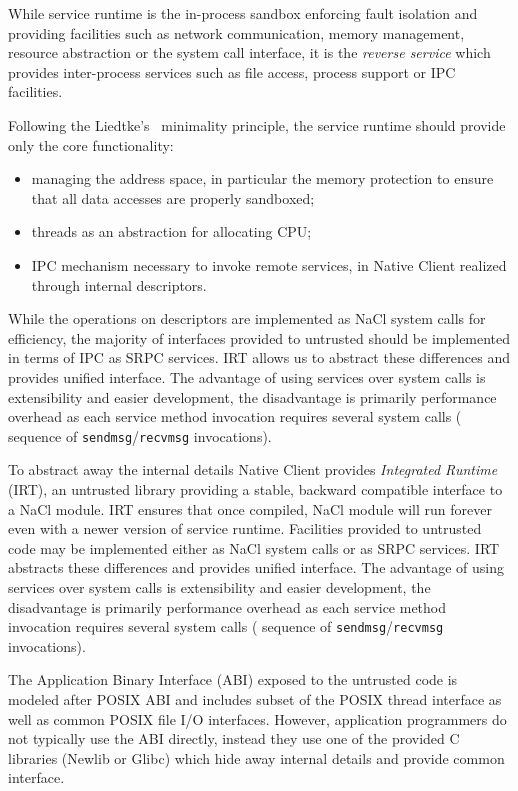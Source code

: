 While service runtime is the in-process sandbox enforcing fault
isolation and providing facilities such as network communication, memory
management, resource abstraction or the system call interface, it is the
\emph{reverse service} which provides inter-process services such as
file access, process support or IPC facilities.

Following the Liedtke's~\cite{liedtke:sosp93} minimality principle, the
service runtime should provide only the core functionality:
\begin{itemize}
\item managing the address space, in particular the memory protection to
	ensure that all data accesses are properly sandboxed; 
\item threads as an abstraction for allocating CPU;
\item IPC mechanism necessary to invoke remote services, in Native
	Client realized through internal descriptors.
\end{itemize}

While the operations on descriptors are implemented as NaCl system calls
for efficiency, the majority of interfaces provided to untrusted should
be implemented in terms of IPC as SRPC services. IRT allows us to
abstract these differences and provides unified interface. The
advantage of using services over system calls is extensibility and
easier development, the disadvantage is primarily performance overhead
as each service method invocation requires several system calls (\ie
sequence of \lstinline`sendmsg`/\lstinline`recvmsg` invocations).


To abstract away the internal details Native Client provides
\emph{Integrated Runtime} (IRT), an untrusted library providing a
stable, backward compatible interface to a NaCl module. IRT ensures that
once compiled, NaCl module will run forever even with a newer version of
service runtime. Facilities provided to untrusted code may be
implemented either as NaCl system calls or as SRPC services. IRT
abstracts these differences and provides unified interface. The
advantage of using services over system calls is extensibility and
easier development, the disadvantage is primarily performance overhead
as each service method invocation requires several system calls (\ie
sequence of \lstinline`sendmsg`/\lstinline`recvmsg` invocations).

The Application Binary Interface (ABI) exposed to the untrusted code is
modeled after POSIX ABI and includes subset of the POSIX thread
interface as well as common POSIX file I/O interfaces.  However,
application programmers do not typically use the ABI directly, instead
they use one of the provided C libraries (\ie Newlib or Glibc) which hide
away internal details and provide common interface.

